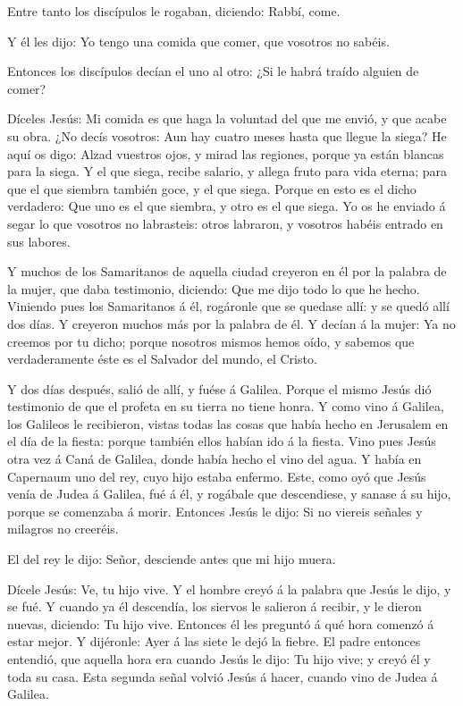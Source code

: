  Entre tanto los discípulos le rogaban, diciendo: Rabbí,
come.

 Y él les dijo: Yo tengo una comida que comer, que vosotros
no sabéis.

 Entonces los discípulos decían el uno al otro: ¿Si le
habrá traído alguien de comer?

 Díceles Jesús: Mi comida es que haga la voluntad del que
me envió, y que acabe su obra.  ¿No decís vosotros: Aun hay
cuatro meses hasta que llegue la siega? He aquí os digo: Alzad vuestros
ojos, y mirad las regiones, porque ya están blancas para la siega.
 Y el que siega, recibe salario, y allega fruto para vida
eterna; para que el que siembra también goce, y el que siega.
 Porque en esto es el dicho verdadero: Que uno es el que
siembra, y otro es el que siega.  Yo os he enviado á segar
lo que vosotros no labrasteis: otros labraron, y vosotros habéis entrado
en sus labores.

 Y muchos de los Samaritanos de aquella ciudad creyeron en
él por la palabra de la mujer, que daba testimonio, diciendo: Que me
dijo todo lo que he hecho.  Viniendo pues los Samaritanos á
él, rogáronle que se quedase allí: y se quedó allí dos días.
 Y creyeron muchos más por la palabra de él. 
Y decían á la mujer: Ya no creemos por tu dicho; porque nosotros mismos
hemos oído, y sabemos que verdaderamente éste es el Salvador del mundo,
el Cristo.

 Y dos días después, salió de allí, y fuése á Galilea.
 Porque el mismo Jesús dió testimonio de que el profeta en
su tierra no tiene honra.  Y como vino á Galilea, los
Galileos le recibieron, vistas todas las cosas que había hecho en
Jerusalem en el día de la fiesta: porque también ellos habían ido á la
fiesta.  Vino pues Jesús otra vez á Caná de Galilea, donde
había hecho el vino del agua. Y había en Capernaum uno del rey, cuyo
hijo estaba enfermo.  Este, como oyó que Jesús venía de
Judea á Galilea, fué á él, y rogábale que descendiese, y sanase á su
hijo, porque se comenzaba á morir.  Entonces Jesús le dijo:
Si no viereis señales y milagros no creeréis.

 El del rey le dijo: Señor, desciende antes que mi hijo
muera.

 Dícele Jesús: Ve, tu hijo vive. Y el hombre creyó á la
palabra que Jesús le dijo, y se fué.  Y cuando ya él
descendía, los siervos le salieron á recibir, y le dieron nuevas,
diciendo: Tu hijo vive.  Entonces él les preguntó á qué
hora comenzó á estar mejor. Y dijéronle: Ayer á las siete le dejó la
fiebre.  El padre entonces entendió, que aquella hora era
cuando Jesús le dijo: Tu hijo vive; y creyó él y toda su casa.
 Esta segunda señal volvió Jesús á hacer, cuando vino de
Judea á Galilea.

